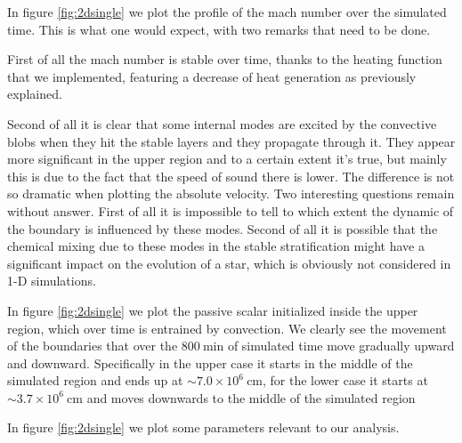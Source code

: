 In figure \ref{fig:2dsingle} we plot the profile of the mach number over the simulated time. This is what one would expect, with two remarks that need to be done. 

First of all the mach number is stable over time, thanks to the heating function that we implemented, featuring a decrease of heat generation as previously explained. 

Second of all it is clear that some internal modes are excited by the convective blobs when they hit the stable layers and they propagate through it. They appear more significant in the upper region and to a certain extent it's true, but mainly this is due to the fact that the speed of sound there is lower. The difference is not so dramatic when plotting the absolute velocity. Two interesting questions remain without answer. First of all it is impossible to tell to which extent the dynamic of the boundary is influenced by these modes. Second of all it is possible that the chemical mixing due to these modes in the stable stratification might have a significant impact on the evolution of a star, which is obviously not considered in 1-D simulations.

\begin{figure}[t!]
  \centering
  \centering
  \hfill
  \caption{}
  \end{figure}
  In figure \ref{fig:2dsingle} we plot the passive scalar initialized inside the upper region, which over time is entrained by convection. We clearly see the movement of the boundaries that over the $800 \ \mathrm{min}$ of simulated time move gradually upward and downward. Specifically in the upper case it starts in the middle of the simulated region and ends up at $\sim 7.0 \times 10^{6} \ \mathrm{cm}$, for the lower case it starts at $\sim 3.7 \times 10^{6} \ \mathrm{cm}$ and moves downwards to the middle of the simulated region 

In figure \ref{fig:2dsingle} we plot some parameters relevant to our analysis. 

